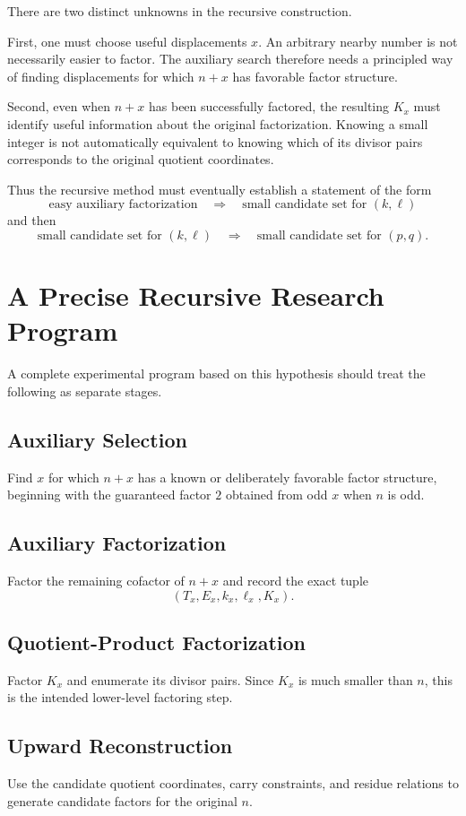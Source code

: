 \documentclass[11pt,a4paper]{article}
\begin{document}
There are two distinct unknowns in the recursive construction.

First, one must choose useful displacements $x$. An arbitrary nearby number
is not necessarily easier to factor. The auxiliary search therefore needs
a principled way of finding displacements for which $n+x$ has favorable
factor structure.

Second, even when $n+x$ has been successfully factored, the resulting
$K_x$ must identify useful information about the original factorization.
Knowing a small integer is not automatically equivalent to knowing which
of its divisor pairs corresponds to the original quotient coordinates.

Thus the recursive method must eventually establish a statement of the form
\[
    \text{easy auxiliary factorization}
    \quad\Longrightarrow\quad
    \text{small candidate set for }(k,\ell)
\]
and then
\[
    \text{small candidate set for }(k,\ell)
    \quad\Longrightarrow\quad
    \text{small candidate set for }(p,q).
\]

\section{A Precise Recursive Research Program}

A complete experimental program based on this hypothesis should treat the
following as separate stages.

\subsection{Auxiliary Selection}
Find $x$ for which $n+x$ has a known or deliberately favorable factor
structure, beginning with the guaranteed factor $2$ obtained from odd
$x$ when $n$ is odd.

\subsection{Auxiliary Factorization}
Factor the remaining cofactor of $n+x$ and record the exact tuple
\[
    (T_x,E_x,k_x,\ell_x,K_x).
\]

\subsection{Quotient-Product Factorization}
Factor $K_x$ and enumerate its divisor pairs. Since $K_x$ is much smaller
than $n$, this is the intended lower-level factoring step.

\subsection{Upward Reconstruction}
Use the candidate quotient coordinates, carry constraints, and residue
relations to generate candidate factors for the original $n$.
\end{document}
